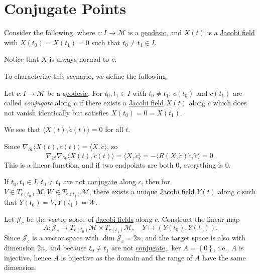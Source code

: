 \section{Conjugate Points}
Consider the following, where \(c\colon I\to \mathcal{M} \) is a \hyperref[def:geodesic]{geodesic}, and \(X(t)\) is a \hyperref[def:Jacobi-field]{Jacobi field} with \(X(t_0)=X(t_1)=0\) such that \(t_0 \neq t_1 \in I\).
\begin{center}
\end{center}

\begin{note}
	Notice that \(X\) is always normal to \(c\).
\end{note}

To characterize this scenario, we define the following.

\begin{definition}\label{def:conjugate-point}
	Let \(c\colon I \to \mathcal{M} \) be a \hyperref[def:geodesic]{geodesic}. For \(t_0, t_1\in I\) with \(t_0 \neq t_1\), \(c(t_0)\) and \(c(t_1)\) are called \emph{conjugate} along \(c\) if there exists a \hyperref[def:Jacobi-field]{Jacobi field} \(X(t)\) along \(c\) which does not vanish identically but satisfies \(X(t_0) = 0 = X(t_1)\).
\end{definition}

\begin{note}
	We see that \(\langle X(t), \dot{c} (t) \rangle = 0\) for all \(t\).
\end{note}
\begin{explanation}
	Since \(\nabla _{\partial t} \langle X(t) , \dot{c} (t) \rangle = \langle \dot{X} , \dot{c} \rangle \), so
	\[
		\nabla _{\partial t} \nabla _{\partial t} \langle X(t), \dot{c} (t)\rangle
		= \langle \ddot{X}, \dot{c}  \rangle
		= -\langle R(X, \dot{c}) \dot{c}, \dot{c}\rangle = 0.
	\]
	This is a linear function, and if two endpoints are both \(0\), everything is \(0\).
\end{explanation}

\begin{note}
	If \(t_0, t_1\in I\), \(t_0 \neq t_1\) are not \hyperref[def:conjugate-point]{conjugate} along \(c\), then for \(V\in T_{c(t_0)} \mathcal{M}, W\in T_{c(t_1)} \mathcal{M} \), there exists a unique \hyperref[def:Jacobi-field]{Jacobi field} \(Y(t)\) along \(c\) such that \(Y(t_0) = V, Y(t_1)=W\).
\end{note}
\begin{explanation}
	Let \(\mathcal{J} _c\) be the vector space of \hyperref[def:Jacobi-field]{Jacobi fields} along \(c\). Construct the linear map
	\[
		A\colon \mathcal{J} _c \to T_{c(t_0)} \mathcal{M} \times T_{c(t_1)} \mathcal{M} ,\quad
		Y \mapsto (Y(t_0), Y(t_1)).
	\]
	Since \(\mathcal{J} _c\) is a vector space with \(\dim \mathcal{J} _c = 2n\), and the target space is also with dimension \(2n\), and because \(t_0 \neq t_1\) are not \hyperref[def:conjugate-point]{conjugate}, \(\ker A = \left\{ 0 \right\} \), i.e., \(A\) is injective, hence \(A\) is bijective as the domain and the range of \(A\) have the same dimension.
\end{explanation}

